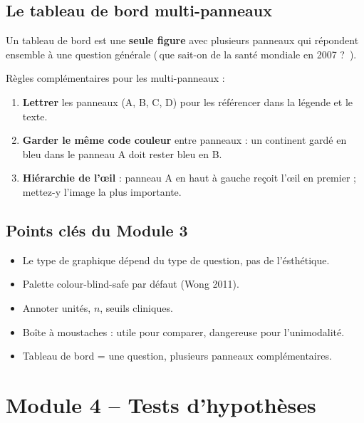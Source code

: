 \documentclass[11pt,a4paper]{article}
\providecommand{\og}{\guillemotleft\,}
\providecommand{\fg}{\,\guillemotright}
\begin{document}
\subsection{Le tableau de bord multi-panneaux}

Un tableau de bord est une \textbf{seule figure} avec plusieurs
panneaux qui r\'epondent ensemble \`a une question g\'en\'erale (\og que
sait-on de la sant\'e mondiale en 2007 ? \fg{}).

R\`egles compl\'ementaires pour les multi-panneaux :

\begin{enumerate}
  \item \textbf{Lettrer} les panneaux (A, B, C, D) pour les r\'ef\'erencer
        dans la l\'egende et le texte.
  \item \textbf{Garder le m\^eme code couleur} entre panneaux : un
        continent gard\'e en bleu dans le panneau A doit rester bleu en B.
  \item \textbf{Hi\'erarchie de l'\oe il} : panneau A en haut \`a gauche
        re\c{c}oit l'\oe il en premier ; mettez-y l'image la plus
        importante.
\end{enumerate}

\subsection{Points cl\'es du Module 3}

\begin{itemize}
  \item Le type de graphique d\'epend du type de question, pas de
        l'\'esth\'etique.
  \item Palette colour-blind-safe par d\'efaut (Wong 2011).
  \item Annoter unit\'es, $n$, seuils cliniques.
  \item Bo\^ite \`a moustaches : utile pour comparer, dangereuse pour
        l'unimodalit\'e.
  \item Tableau de bord = une question, plusieurs panneaux compl\'ementaires.
\end{itemize}

\newpage


\section{Module 4 -- Tests d'hypoth\`eses}
\end{document}
